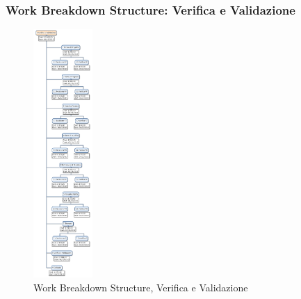\newpage
\subsubsection{Work Breakdown Structure: Verifica e Validazione}
\begin{figure}[h]
	\centering
	\includegraphics[width=0.2\textwidth]{./img/wbs_verifica.png}
	\caption{Work Breakdown Structure, Verifica e Validazione}
\end{figure}

